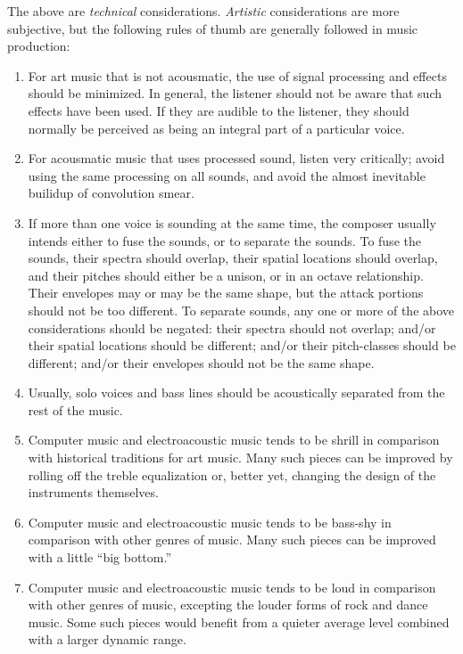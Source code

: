 \documentclass[english,11pt,letterpaper,onecolumn]{scrartcl}
\begin{document}
The above are \emph{technical} considerations. \emph{Artistic} considerations 
are more subjective, but the following rules of thumb are generally followed 
in music production:

\begin{enumerate}

	\item For art music that is not acousmatic, the use of signal processing 
and effects should be minimized. In general, the listener should not be aware 
that such effects have been used. If they are audible to the listener, they 
should normally be perceived as being an integral part of a particular voice.

    \item For acousmatic music that uses processed sound, listen very 
critically; avoid using the same processing on all sounds, and avoid the 
almost inevitable builidup of convolution smear.
	
	\item If more than one voice is sounding at the same time, the composer 
usually intends either to fuse the sounds, or to separate the sounds. To fuse 
the sounds, their spectra should overlap, their spatial locations should 
overlap, and their pitches should either be a unison, or in an octave 
relationship. Their envelopes may or may be the same shape, but the attack 
portions should not be too different. To separate sounds, any one or more of 
the above considerations should be negated: their spectra should not overlap; 
and/or their spatial locations should be different; and/or their pitch-classes 
should be different; and/or their envelopes should not be the same shape.
	
	\item Usually, solo voices and bass lines should be acoustically separated 
from the rest of the music.
	
	\item Computer music and electroacoustic music tends to be shrill in 
comparison with historical traditions for art music. Many such pieces can be 
improved by rolling off the treble equalization or, better yet, changing the 
design of the instruments themselves.
	
	\item Computer music and electroacoustic music tends to be bass-shy in 
comparison with other genres of music. Many such pieces can be improved with a 
little ``big bottom.''
	
	\item Computer music and electroacoustic music tends to be loud in 
comparison with other genres of music, excepting the louder forms of rock and 
dance music. Some such pieces would benefit from a quieter average level 
combined with a larger dynamic range.
	

\end{enumerate}
\end{document}
